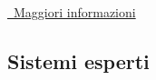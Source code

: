 \begin{frame}[t,fragile]
{\begin{minipage}[b]{\textwidth}
		\begin{center}
			\href{http://www.computer-timeline.com/timeline/logic-theorist-simon-newell-and-shaw/}{\faLink\ Maggiori informazioni}
		\end{center}
	\end{minipage}
}
\end{frame}
%
\subsection{Sistemi esperti}
\label{subsec:appendix-expert-systems}
%
